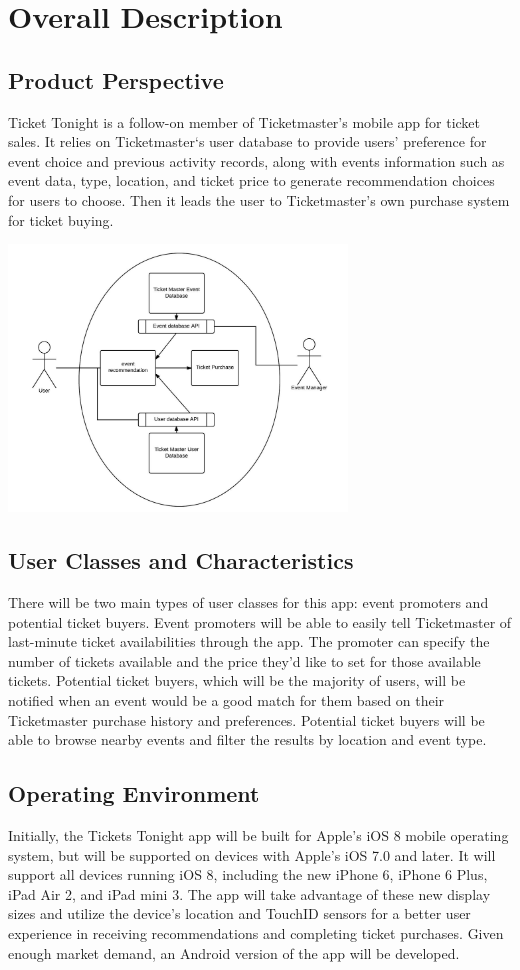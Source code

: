 	\section{Overall Description}
		\subsection{Product Perspective}
		Ticket Tonight is a follow-on member of Ticketmaster’s mobile app for ticket sales. It relies on Ticketmaster‘s user database to provide users’ preference for event choice and previous activity records, along with events information such as event data, type, location, and ticket price to generate recommendation choices for users to choose. Then it leads the user to Ticketmaster’s own purchase system for ticket buying.
		\begin{center}
			\includegraphics[width=90mm]{./pp1.jpg}
		\end{center}
		\subsection{User Classes and Characteristics}
		 There will be two main types of user classes for this app: event promoters and potential ticket buyers. Event promoters will be able to easily tell Ticketmaster of last-minute ticket availabilities through the app. The promoter can specify the number of tickets available and the price they’d like to set for those available tickets. Potential ticket buyers, which will be the majority of users, will be notified when an event would be a good match for them based on their Ticketmaster purchase history and preferences. Potential ticket buyers will be able to browse nearby events and filter the results by location and event type. 
		 \subsection{Operating Environment}
		 Initially, the Tickets Tonight app will be built for Apple’s iOS 8 mobile operating system, but will be supported on devices with Apple’s iOS 7.0 and later. It will support all devices running iOS 8, including the new iPhone 6, iPhone 6 Plus, iPad Air 2, and iPad mini 3.  The app will take advantage of these new display sizes and utilize the device’s location and TouchID sensors for a better user experience in receiving recommendations and completing ticket purchases. Given enough market demand, an Android version of the app will be developed. 
